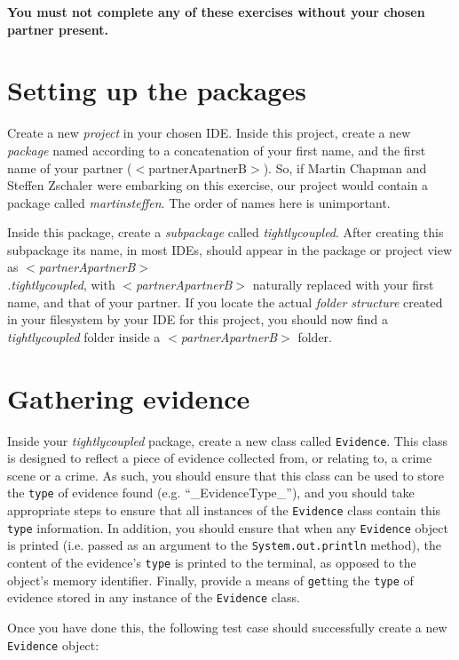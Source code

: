 \documentclass[11pt]{article}
\begin{document}
\textbf{You must not complete any of these exercises without your chosen partner present.}

\section{Setting up the packages}

Create a new \emph{project} in your chosen IDE. Inside this project, create a new \emph{package} named according to a concatenation of your first name, and the first name of your partner ($<$partnerApartnerB$>$). So, if Martin Chapman and Steffen Zschaler were embarking on this exercise, our project would contain a package called \emph{martinsteffen}. The order of names here is unimportant.

Inside this package, create a \emph{subpackage} called \emph{tightlycoupled}. After creating this subpackage its name, in most IDEs, should appear in the package or project view as $<$\emph{partnerApartnerB}$>$\\\emph{.tightlycoupled}, with $<$\emph{partnerApartnerB}$>$ naturally replaced with your first name, and that of your partner. If you locate the actual \emph{folder structure} created in your filesystem by your IDE for this project, you should now find a \emph{tightlycoupled} folder inside a $<$\emph{partnerApartnerB}$>$ folder. 

\section{Gathering evidence}

Inside your \emph{tightlycoupled} package, create a new class called \texttt{Evidence}. This class is designed to reflect a piece of evidence collected from, or relating to, a crime scene or a crime. As such, you should ensure that this class can be used to store the \texttt{type} of evidence found (e.g. ``_EvidenceType_''), and you should take appropriate steps to ensure that all instances of the \texttt{Evidence} class contain this \texttt{type} information. In addition, you should ensure that when any \texttt{Evidence} object is printed (i.e. passed as an argument to the \texttt{System.out.println} method), the content of the evidence's \texttt{type} is printed to the terminal, as opposed to the object's memory identifier. Finally, provide a means of \texttt{get}ting the \texttt{type} of evidence stored in any instance of the \texttt{Evidence} class.

Once you have done this, the following test case should successfully create a new \texttt{Evidence} object:
\end{document}
